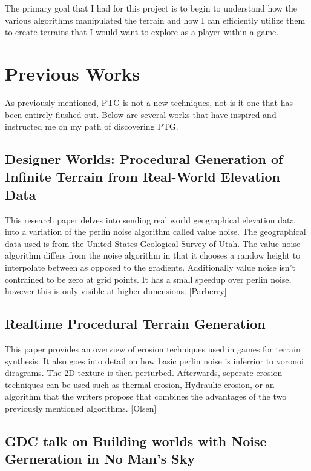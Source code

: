 \documentclass[12pt]{article}
\begin{document}
        The primary goal that I had for this project is to begin to understand how the various algorithms manipulated 
        the terrain and how I can efficiently utilize them to create terrains that I would want to explore as a 
        player within a game.

\section{Previous Works}
    As previously mentioned, PTG is not a new techniques, not is it one that has been entirely flushed out. Below are several 
    works that have inspired and instructed me on my path of discovering PTG.

    \subsection{Designer Worlds: Procedural Generation of Infinite Terrain from Real-World Elevation Data}

        This research paper delves into sending real world geographical elevation data into a variation of the perlin 
        noise algorithm called value noise. The geographical data used is from the United States Geological Survey of Utah.
        The value noise algorithm differs from the noise algorithm in that it chooses a randow height to interpolate between 
        as opposed to the gradients. Additionally value noise isn't contrained to be zero at grid points. It has a small speedup 
        over perlin noise, however this is only visible at higher dimensions. [Parberry]

    \subsection{Realtime Procedural Terrain Generation}

        This paper provides an overview of erosion techniques used in games for terrain synthesis. It also goes into 
        detail on how basic perlin noise is inferrior to voronoi diragrams. The 2D texture is then perturbed. Afterwards, 
        seperate erosion techniques can be used such as thermal erosion, Hydraulic erosion, or an algorithm that the writers 
        propose that combines the advantages of the two previously mentioned algorithms. [Olsen]

    \subsection{GDC talk on Building worlds with Noise Gerneration in No Man's Sky}
\end{document}

